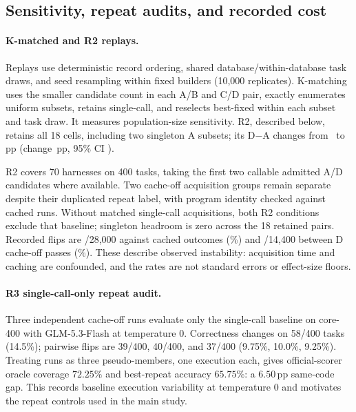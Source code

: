 \FloatBarrier
\subsection{Sensitivity, repeat audits, and recorded cost}
\paragraph{K-matched and R2 replays.}\label{app:r2}
Replays use deterministic record ordering, shared database/within-database
task draws, and seed resampling within fixed builders
(10{,}000 replicates). K-matching uses the smaller candidate count in
each A/B and C/D pair, exactly enumerates uniform subsets, retains
single-call, and reselects best-fixed within each subset and task draw.
It measures population-size sensitivity. R2, described below, retains
all 18 cells, including two singleton A subsets; its D$-$A changes from
\RevisionRtwoCached\ to \RevisionRtwoOff\,pp
(change \RevisionRtwoChange\,pp, 95\% CI \RevisionRtwoChangeCI).

R2 covers 70 harnesses on 400 tasks, taking the first two callable
admitted A/D candidates where available. Two cache-off acquisition groups
remain separate despite their duplicated repeat label, with program
identity checked against cached runs. Without matched single-call
acquisitions, both R2 conditions exclude that baseline; singleton
headroom is zero across the 18 retained pairs. Recorded flips are
\RevisionRtwoFlips/28{,}000 against cached outcomes
(\RevisionRtwoFlipPercent\%) and \RevisionRtwoRepeatFlips/14{,}400
between D cache-off passes (\RevisionRtwoRepeatPercent\%).
These describe observed instability: acquisition time and caching are
confounded, and the rates are not standard errors or effect-size floors.

\paragraph{R3 single-call-only repeat audit.}\label{app:r3}
Three independent cache-off runs evaluate only the single-call baseline
on core-400 with GLM-5.3-Flash at temperature 0. Correctness changes on
58/400 tasks (14.5\%); pairwise flips are 39/400, 40/400, and 37/400
(9.75\%, 10.0\%, 9.25\%). Treating runs as three pseudo-members,
one execution each, gives official-scorer oracle coverage $72.25\%$
and best-repeat accuracy $65.75\%$: a $6.50$\,pp same-code gap.
This records baseline execution variability at temperature 0
and motivates the repeat controls used in the main study.

